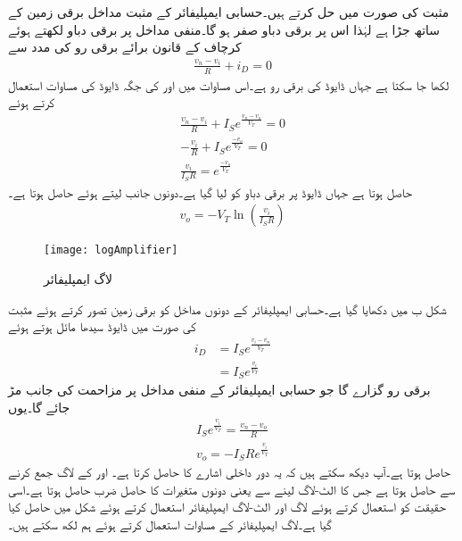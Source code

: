 مثبت  کی صورت میں حل کرتے ہیں۔حسابی ایمپلیفائر کے مثبت مداخل برقی زمین کے ساتھ جڑا ہے لہٰذا اس پر برقی دباو  صفر ہو گا۔منفی مداخل پر برقی دباو  لکھتے ہوئے کرچاف کے قانون برائے برقی رو کی مدد سے
\begin{align*}
\frac{v_n-v_i}{R}+i_D=0
\end{align*}
لکھا جا سکتا ہے جہاں  ڈایوڈ  کی برقی رو ہے۔اس مساوات میں   اور  کی جگہ ڈایوڈ کی مساوات استعمال کرتے ہوئے 
\begin{align*}
\frac{v_n-v_i}{R}+I_S e^{\frac{v_n-v_o}{V_T}}=0\\
-\frac{v_i}{R}+I_S e^{\frac{-v_o}{V_T}}=0\\
\frac{v_i}{I_S R}= e^{\frac{-v_o}{V_T}}
\end{align*}
حاصل ہوتا ہے جہاں ڈایوڈ پر برقی دباو کو  لیا گیا ہے۔دونوں جانب  لیتے ہوئے حاصل ہوتا ہے۔
\begin{align*}
v_o=-V_T \ln {\left( \frac{v_i}{I_S R} \right)}
\end{align*}
%
\begin{figure}
\centering
\texttt{[image: logAmplifier]}
\caption{لاگ ایمپلیفائر}
\label{شکل_ڈایوڈ_لاگ_ایمپلیفائر}
\end{figure}

شکل  ب میں   دکھایا گیا ہے۔حسابی ایمپلیفائر کے دونوں مداخل کو برقی زمین تصور کرتے ہوئے مثبت  کی صورت میں ڈایوڈ  سیدھا مائل ہوتے ہوئے
\begin{align*}
i_D&=I_S e^{\frac{v_i-v_n}{V_T}}\\
&=I_S e^{\frac{v_i}{V_T}}
\end{align*}
برقی رو گزارے گا جو حسابی ایمپلیفائر کے منفی مداخل پر مزاحمت کی جانب مڑ جائے گا۔یوں
\begin{align*}
I_S e^{\frac{v_i}{V_T}}=\frac{v_n-v_o}{R}\\
v_o=-I_S R e^{\frac{v_i}{V_T}}
\end{align*}
حاصل ہوتا ہے۔آپ دیکھ سکتے ہیں کہ یہ دور داخلی اشارے کا  حاصل کرتا ہے۔
 اور  کے لاگ جمع کرنے سے  حاصل ہوتا ہے جس کا الٹ-لاگ لینے سے  یعنی دونوں متغیرات کا حاصل ضرب حاصل ہوتا ہے۔اسی حقیقت کو استعمال کرتے ہوئے لاگ اور الٹ-لاگ ایمپلیفائر استعمال کرتے  ہوئے شکل  میں  حاصل کیا گیا ہے۔لاگ ایمپلیفائر کے مساوات استعمال کرتے ہوئے ہم لکھ سکتے ہیں۔

